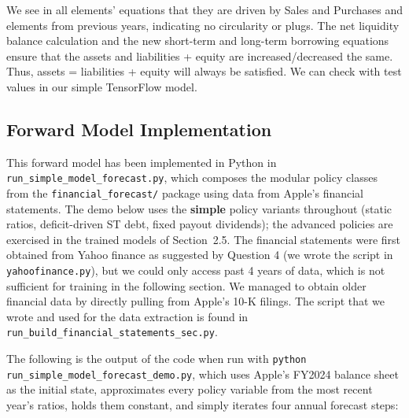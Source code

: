 \documentclass[12pt,a4paper]{article}
\begin{document}
We see in all elements' equations that they are driven by Sales and
Purchases and elements from previous years, indicating no circularity or
plugs. The net liquidity balance calculation and the new short-term and
long-term borrowing equations ensure that the assets and liabilities +
equity are increased/decreased the same. Thus, assets = liabilities +
equity will always be satisfied. We can check with test values in our
simple TensorFlow model.

\subsection{Forward Model Implementation}

This forward model has been implemented in Python in
\texttt{run\_simple\_model\_forecast.py}, which composes
the modular policy classes from the \texttt{financial\_forecast/} package
using data from Apple's financial
statements. The demo below uses the \textbf{simple} policy variants
throughout (static ratios, deficit-driven ST debt, fixed payout
dividends); the advanced policies are exercised in the trained models of
Section~2.5. The financial statements were first obtained from Yahoo
finance as suggested by Question 4 (we wrote the script in
\texttt{yahoofinance.py}), but we could only access past 4 years of
data, which is not sufficient for training in the following section. We
managed to obtain older financial data by directly pulling from Apple's
10-K filings. The script that we wrote and used for the data extraction
is found in \texttt{run\_build\_financial\_statements\_sec.py}.

The following is the output of the code when run with
\texttt{python run\_simple\allowbreak{}\_model\allowbreak{}\_forecast\allowbreak{}\_demo.py},
which uses Apple's FY2024 balance sheet as the initial state,
approximates every policy variable from the most recent year's ratios,
holds them constant, and simply iterates four annual forecast steps:
\end{document}
